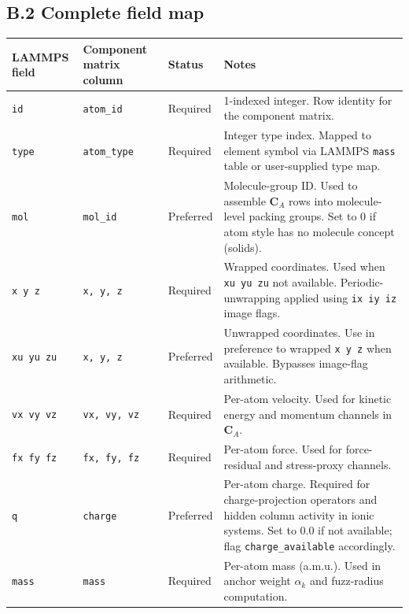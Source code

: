 \documentclass[11pt, a4paper, oneside]{article}
\newcommand{\Comp}[1]{\mathbf{C}_{#1}}
\begin{document}
\begin{appendices}
\subsection*{B.2 Complete field map}

\begin{longtable}{p{2.2cm} p{2.5cm} p{1.8cm} p{7.1cm}}
  \toprule
  \textbf{LAMMPS field} & \textbf{Component matrix column} &
  \textbf{Status} & \textbf{Notes} \\
  \midrule
  \endhead

  \texttt{id}       & \texttt{atom\_id}     & Required &
	1-indexed integer. Row identity for the component matrix. \\

  \texttt{type}     & \texttt{atom\_type}   & Required &
	Integer type index. Mapped to element symbol via
	LAMMPS \texttt{mass} table or user-supplied type map. \\

  \texttt{mol}      & \texttt{mol\_id}      & Preferred &
	Molecule-group ID. Used to assemble $\Comp{A}$ rows into
	molecule-level packing groups. Set to 0 if atom style has
	no molecule concept (solids). \\

  \texttt{x y z}    & \texttt{x, y, z}     & Required &
	Wrapped coordinates. Used when \texttt{xu yu zu} not available.
	Periodic-unwrapping applied using \texttt{ix iy iz} image flags. \\

  \texttt{xu yu zu} & \texttt{x, y, z}     & Preferred &
	Unwrapped coordinates. Use in preference to wrapped
	\texttt{x y z} when available. Bypasses image-flag arithmetic. \\

  \texttt{vx vy vz} & \texttt{vx, vy, vz}  & Required &
	Per-atom velocity. Used for kinetic energy and momentum
	channels in $\Comp{A}$. \\

  \texttt{fx fy fz} & \texttt{fx, fy, fz}  & Required &
	Per-atom force. Used for force-residual and stress-proxy
	channels. \\

  \texttt{q}        & \texttt{charge}       & Preferred &
	Per-atom charge. Required for charge-projection operators
	and hidden column activity in ionic systems.
	Set to 0.0 if not available; flag \texttt{charge\_available}
	accordingly. \\

  \texttt{mass}     & \texttt{mass}         & Required &
	Per-atom mass (a.m.u.). Used in anchor weight $\alpha_k$
	and fuzz-radius computation. \\


\end{longtable}
\end{appendices}
\end{document}
